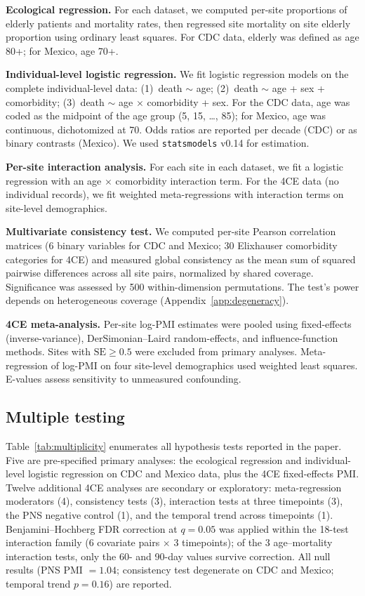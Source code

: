 \documentclass{article}
\begin{document}
\textbf{Ecological regression.}  For each dataset, we computed per-site
proportions of elderly patients and mortality rates, then regressed site
mortality on site elderly proportion using ordinary least squares.  For CDC
data, elderly was defined as age 80+; for Mexico, age 70+.

\textbf{Individual-level logistic regression.}  We fit logistic regression
models on the complete individual-level data: (1)~death $\sim$ age;
(2)~death $\sim$ age + sex + comorbidity; (3)~death $\sim$ age $\times$
comorbidity + sex.  For the CDC data, age was coded as the midpoint of the
age group (5, 15, \ldots, 85); for Mexico, age was continuous, dichotomized
at 70.  Odds ratios are reported per decade (CDC) or as binary contrasts
(Mexico).  We used \texttt{statsmodels} v0.14 for estimation.

\textbf{Per-site interaction analysis.}  For each site in each dataset, we
fit a logistic regression with an age $\times$ comorbidity interaction term.
For the 4CE data (no individual records), we fit weighted meta-regressions
with interaction terms on site-level demographics.

\textbf{Multivariate consistency test.}  We computed per-site Pearson
correlation matrices (6 binary variables for CDC and Mexico; 30 Elixhauser
comorbidity categories for 4CE) and measured global consistency as the mean
sum of squared pairwise differences across all site pairs, normalized by
shared coverage.  Significance was assessed by 500 within-dimension
permutations.  The test's power depends on heterogeneous coverage
(Appendix~\ref{app:degeneracy}).

\textbf{4CE meta-analysis.}  Per-site log-PMI estimates were pooled using
fixed-effects (inverse-variance), DerSimonian--Laird random-effects, and
influence-function methods.  Sites with $\text{SE} \geq 0.5$ were excluded
from primary analyses.  Meta-regression of log-PMI on four site-level
demographics used weighted least squares.  E-values \cite{vanderweele2017}
assess sensitivity to unmeasured confounding.

\subsection{Multiple testing}

Table~\ref{tab:multiplicity} enumerates all hypothesis tests reported in
the paper.  Five are pre-specified primary analyses: the ecological
regression and individual-level logistic regression on CDC and Mexico data,
plus the 4CE fixed-effects PMI.  Twelve additional 4CE analyses are
secondary or exploratory: meta-regression moderators (4), consistency
tests (3), interaction tests at three timepoints (3), the PNS negative
control (1), and the temporal trend across timepoints (1).
Benjamini--Hochberg FDR correction at $q = 0.05$ was applied within
the 18-test interaction family (6 covariate pairs $\times$ 3
timepoints); of the 3 age--mortality interaction tests, only the 60-
and 90-day values survive correction.  All null results (PNS PMI
$= 1.04$; consistency test degenerate on CDC and Mexico; temporal trend
$p = 0.16$) are reported.
\end{document}
